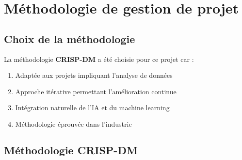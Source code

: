 \documentclass[12pt,a4paper]{report}
\begin{document}
\section{Méthodologie de gestion de projet}

\subsection{Choix de la méthodologie}

La méthodologie \textbf{CRISP-DM} a été choisie pour ce projet car :

\begin{enumerate}
    \item Adaptée aux projets impliquant l'analyse de données
    \item Approche itérative permettant l'amélioration continue
    \item Intégration naturelle de l'IA et du machine learning
    \item Méthodologie éprouvée dans l'industrie
\end{enumerate}

\subsection{Méthodologie CRISP-DM}
\end{document}

